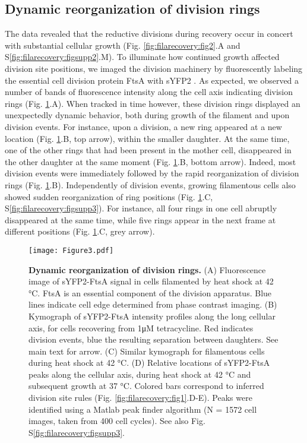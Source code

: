 \subsection{Dynamic reorganization of division rings}
The data revealed that the reductive divisions during recovery occur in concert with substantial cellular growth (Fig. \ref{fig:filarecovery:fig2}.A and S\ref{fig:filarecovery:figsupp2}.M). To illuminate how continued growth affected division site positions, we imaged the division machinery by fluorescently labeling the essential cell division protein FtsA with sYFP2 \cite{Erickson2010, Lutkenhaus2012}. As expected, we observed a number of bands of fluorescence intensity along the cell axis indicating division rings \cite{Addinall1997, Arjes2014, Mileykovskaya1998}  (Fig. \ref{fig:filarecovery:fig3}.A). When tracked in time however, these division rings displayed an unexpectedly dynamic behavior, both during growth of the filament and upon division events. For instance, upon a division, a new ring appeared at a new location (Fig. \ref{fig:filarecovery:fig3}.B, top arrow), within the smaller daughter. At the same time, one of the other rings that had been present in the mother cell, disappeared in the other daughter at the same moment (Fig. \ref{fig:filarecovery:fig3}.B, bottom arrow). Indeed, most division events were immediately followed by the rapid reorganization of division rings (Fig. \ref{fig:filarecovery:fig3}.B). Independently of division events, growing filamentous cells also showed sudden reorganization of ring positions (Fig. \ref{fig:filarecovery:fig3}.C, S\ref{fig:filarecovery:figsupp3}). For instance, all four rings in one cell abruptly disappeared at the same time, while five rings appear in the next frame at different positions (Fig. \ref{fig:filarecovery:fig3}.C, grey arrow).

\begin{figure}
    \centering
    \texttt{[image: Figure3.pdf]}
    \caption{ 
        \textbf{Dynamic reorganization of division rings.}           
        (A) Fluorescence image of sYFP2-FtsA signal in cells filamented by heat shock at 42 °C. FtsA is an essential component of the division apparatus. Blue lines indicate cell edge determined from phase contrast imaging. (B) Kymograph of sYFP2-FtsA intensity profiles along the long cellular axis, for cells recovering from 1μM tetracycline. Red indicates division events, blue the resulting separation between daughters. See main text for arrow. (C) Similar kymograph for filamentous cells during heat shock at 42 °C. (D) Relative locations of sYFP2-FtsA peaks along the cellular axis, during heat shock at 42 °C and subsequent growth at 37 °C. Colored bars correspond to inferred division site rules (Fig. \ref{fig:filarecovery:fig1}.D-E). Peaks were identified using a Matlab peak finder algorithm (N = 1572 cell images, taken from 400 cell cycles). See also Fig. S\ref{fig:filarecovery:figsupp3}.        
    }
    \label{fig:filarecovery:fig3}
\end{figure}

